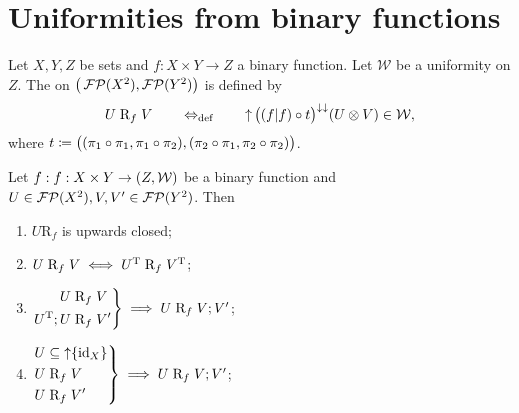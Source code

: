 \section{Uniformities from binary functions}
\begin{definition}
Let $X,Y,Z$ be sets and $f: X\times Y\to Z$ a binary function. Let $\mathcal{W}$ be a uniformity on $Z$. The  on $\big(\operatorname{\mathcal{FP}}(X^2),\operatorname{\mathcal{FP}}(Y^2)\big)$ is defined by
\[ U\mathrel{\mathrm{R}_{f}} V \quad\quad\Leftrightarrow_{\text{def}}\quad\quad \operatorname{\uparrow}\big((f|f)\circ t \big)^{\downarrow\downarrow}(U\otimes V) \in \mathcal{W}, \]
where $t \coloneqq \big((\pi_1\circ \pi_1, \pi_1\circ \pi_2),(\pi_2\circ \pi_1, \pi_2\circ \pi_2)\big)$.
\end{definition}

\begin{lemma} \label{polarUniformityLemma}
Let $f: f: X\times Y\to \left( Z, \mathcal{W} \right)$ be a binary function and $U\in \operatorname{\mathcal{FP}}(X^2), V,V'\in \operatorname{\mathcal{FP}}(Y^2)$. Then 
\begin{enumerate}
\item $U\mathrel{\mathrm{R}_{f}}$ is upwards closed;
\item $U\mathrel{\mathrm{R}_{f}} V \iff U^{\mathrm{T}}\mathrel{\mathrm{R}_{f}} V^{\mathrm{T}}$;
\item $\left.\begin{aligned}U&\mathrel{\mathrm{R}_{f}} V \\ U^{\mathrm{T}};U&\mathrel{\mathrm{R}_{f}} V'\end{aligned}\right\} \implies U\mathrel{\mathrm{R}_{f}} V;V'$;
\item $\left.\begin{aligned}
U &\subseteq \operatorname{\uparrow}\{\operatorname{id}_X\} \\
U&\mathrel{\mathrm{R}_{f}} V \\
U&\mathrel{\mathrm{R}_{f}} V'
\end{aligned}\right\} \implies U\mathrel{\mathrm{R}_{f}} V;V'$;
\end{enumerate}
\end{lemma}
